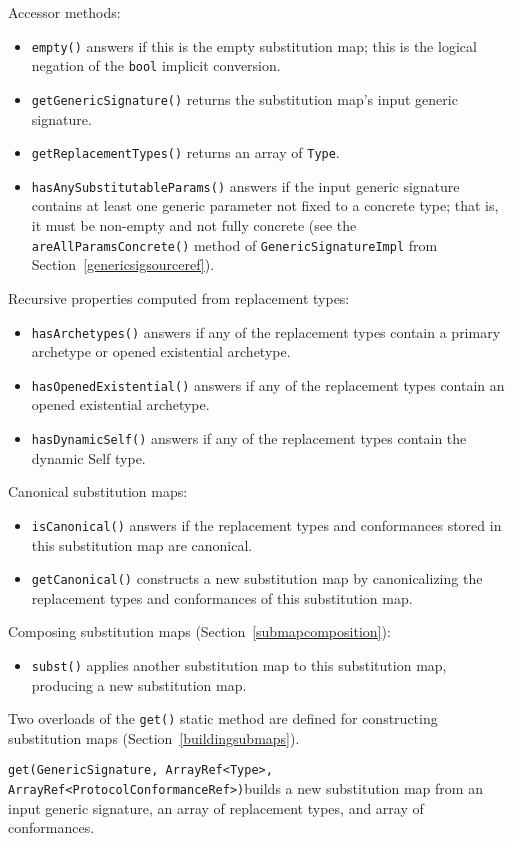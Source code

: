 \documentclass[a4paper,headsepline,bibliography=totoc,toc=flat,fleqn,twoside=semi]{scrbook}
\theoremstyle{definition}
\theoremstyle{definition}
\theoremstyle{definition}
\begin{document}
Accessor methods:
\begin{itemize}
\item \texttt{empty()} answers if this is the empty substitution map; this is the logical negation of the \texttt{bool} implicit conversion.
\item \texttt{getGenericSignature()} returns the substitution map's input generic signature.
\item \texttt{getReplacementTypes()} returns an array of \texttt{Type}.
\item \texttt{hasAnySubstitutableParams()} answers if the input generic signature contains at least one generic parameter not fixed to a concrete type; that is, it must be non-empty and not fully concrete (see the \texttt{areAllParamsConcrete()} method of \texttt{GenericSignatureImpl} from Section~\ref{genericsigsourceref}).
\end{itemize}
Recursive properties computed from replacement types:
\begin{itemize}
\item \texttt{hasArchetypes()} answers if any of the replacement types contain a primary archetype or opened existential archetype.
\item \texttt{hasOpenedExistential()} answers if any of the replacement types contain an opened existential archetype.
\item \texttt{hasDynamicSelf()} answers if any of the replacement types contain the dynamic Self type.
\end{itemize}
Canonical substitution maps:
\begin{itemize}
\item \texttt{isCanonical()} answers if the replacement types and conformances stored in this substitution map are canonical.
\item \texttt{getCanonical()} constructs a new substitution map by canonicalizing the replacement types and conformances of this substitution map.
\end{itemize}
Composing substitution maps (Section~\ref{submapcomposition}):
\begin{itemize}
\item \texttt{subst()} applies another substitution map to this substitution map, producing a new substitution map.
\end{itemize}
Two overloads of the \texttt{get()} static method are defined for constructing substitution maps (Section~\ref{buildingsubmaps}).

\medskip
\noindent
\texttt{get(GenericSignature, ArrayRef<Type>, ArrayRef<ProtocolConformanceRef>)}\newline builds a new substitution map from an input generic signature, an array of replacement types, and array of conformances.
\end{document}

